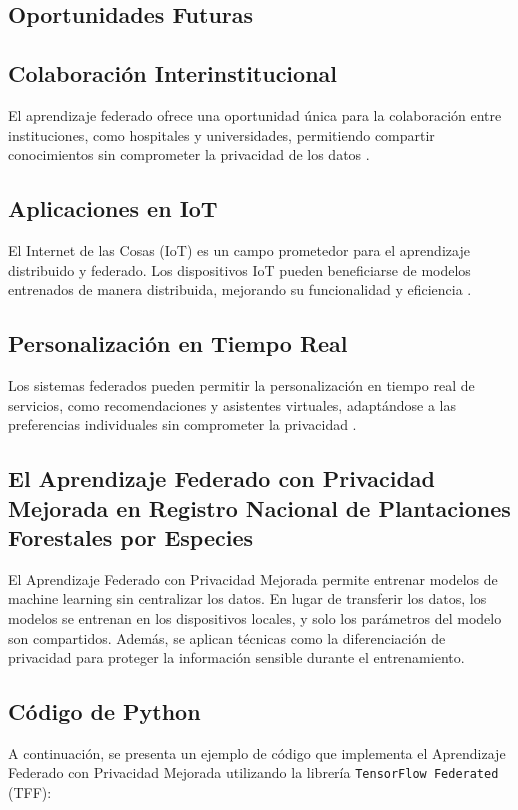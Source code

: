 \subsection{Oportunidades Futuras}
\subsection{Colaboración Interinstitucional}
El aprendizaje federado ofrece una oportunidad única para la colaboración entre instituciones, como hospitales y universidades, permitiendo compartir conocimientos sin comprometer la privacidad de los datos \cite{googlehealth2020}.

\subsection{Aplicaciones en IoT}
El Internet de las Cosas (IoT) es un campo prometedor para el aprendizaje distribuido y federado. Los dispositivos IoT pueden beneficiarse de modelos entrenados de manera distribuida, mejorando su funcionalidad y eficiencia \cite{shi2016edge}.

\subsection{Personalización en Tiempo Real}
Los sistemas federados pueden permitir la personalización en tiempo real de servicios, como recomendaciones y asistentes virtuales, adaptándose a las preferencias individuales sin comprometer la privacidad \cite{alibaba2020}.

\subsection{El Aprendizaje Federado con Privacidad Mejorada en Registro Nacional de Plantaciones Forestales por Especies}
El Aprendizaje Federado con Privacidad Mejorada permite entrenar modelos de machine learning sin centralizar los datos. En lugar de transferir los datos, los modelos se entrenan en los dispositivos locales, y solo los parámetros del modelo son compartidos. Además, se aplican técnicas como la diferenciación de privacidad para proteger la información sensible durante el entrenamiento.

\subsection{Código de Python}
A continuación, se presenta un ejemplo de código que implementa el Aprendizaje Federado con Privacidad Mejorada utilizando la librería \texttt{TensorFlow Federated} (TFF):

